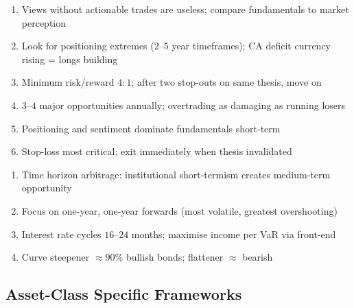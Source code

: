 \begin{remark} 
\begin{enumerate}[label=\roman*.]
\setlength{\itemsep}{0pt}
\item Views without actionable trades are useless; compare fundamentals to market perception
\item Look for positioning extremes ($2$--$5$ year timeframes); CA deficit currency rising = longs building
\item Minimum risk/reward $4:1$; after two stop-outs on same thesis, move on
\item $3$--$4$ major opportunities annually; overtrading as damaging as running losers
\item Positioning and sentiment dominate fundamentals short-term
\item Stop-loss most critical; exit immediately when thesis invalidated
\end{enumerate}
\end{remark}

\begin{remark} 
\begin{enumerate}[label=\roman*.]
\setlength{\itemsep}{0pt}
\item Time horizon arbitrage: institutional short-termism creates medium-term opportunity
\item Focus on one-year, one-year forwards (most volatile, greatest overshooting)
\item Interest rate cycles $16$--$24$ months; maximise income per VaR via front-end
\item Curve steepener $\approx 90\%$ bullish bonds; flattener $\approx$ bearish
\end{enumerate}
\end{remark}

\subsection{Asset-Class Specific Frameworks}


